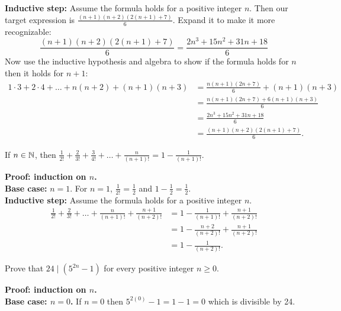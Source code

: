 \documentclass{article}
\begin{document}
\textbf{Inductive step:} Assume the formula holds for a positive integer $n$. Then our target expression is $\frac{(n+1)(n+2)(2(n+1)+7)}{6}$. Expand it to make it more recognizable:
$$\frac{(n+1)(n+2)(2(n+1) + 7)}{6} = \frac{2n^3 + 15n^2 + 31n + 18}{6}$$
Now use the inductive hypothesis and algebra to show if the formula holds for $n$ then it holds for $n+1$:
\begin{align*}
  1\cdot 3 + 2\cdot 4 + \ldots + n(n+2) + (n+1)(n+3) & = \frac{n(n+1)(2n+7)}{6} + (n+1)(n+3)  \\
                                                     & = \frac{n(n+1)(2n+7) + 6(n+1)(n+3)}{6} \\
                                                     & = \frac{2n^3 + 15n^2 + 31n + 18}{6}    \\
                                                     & = \frac{(n+1)(n+2)(2(n+1) + 7)}{6}.
\end{align*}

\begin{problem}
If $n \in \mathbb{N}$, then $\frac{1}{2!} + \frac{2}{3!} + \frac{3}{4!} + \ldots + \frac{n}{(n+1)!} = 1 - \frac{1}{(n+1)!}$.
\end{problem}

\textbf{Proof: induction on $n$.}
\\

\textbf{Base case:} $n = 1$. For $n = 1$, $\frac{1}{2!} = \frac{1}{2}$ and $1 - \frac{1}{2} = \frac{1}{2}$.
\\

\textbf{Inductive step:} Assume the formula holds for a positive integer $n$.
\begin{align*}
  \frac{1}{2!} + \frac{2}{3!} + \ldots + \frac{n}{(n+1)!} + \frac{n+1}{(n+2)!} & = 1 - \frac{1}{(n+1)!} + \frac{n+1}{(n+2)!}   \\
                                                                               & = 1 - \frac{n+2}{(n+2)!} + \frac{n+1}{(n+2)!} \\
                                                                               & = 1 - \frac{1}{(n+2)!}.
\end{align*}

\begin{problem}
Prove that $24 \mid (5^{2n} - 1)$ for every positive integer $n \geq 0$.
\end{problem}
\textbf{Proof: induction on $n$.}
\\

\textbf{Base case: $n = 0$.} If $n = 0$ then $5^{2(0)} - 1 = 1 - 1 = 0$ which is divisible by 24.
\\
\end{document}
